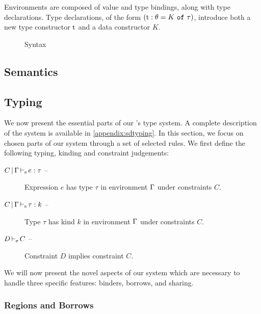 
Environments are composed of value and type bindings, along with type
declarations. Type declarations, of the form
$(\mathrm{t} : \theta = K\ \mathtt{of}\ \tau)$, introduce both a new type constructor $\mathrm{t}$ and
a data constructor $K$.

\begin{figure*}[t]
  \centering
  
  \caption{Syntax}
  \label{grammar}
\end{figure*}


\clearpage
\subsection{Semantics}
\label{sem}




\clearpage
\subsection{Typing}
\label{sdtyping}

We now present the essential parts of our \lang's type system. A complete
description of the system is available in \cref{appendix:sdtyping}.
In this section, we focus on chosen parts of our system
through a set of selected rules.
%
We first define the following typing, kinding and constraint judgements:
\begin{description}
\item[$C \operatorname{|} \Gamma \operatorname{\vdash_s} e : \tau$ --]
  Expression $e$ has type $\tau$ in environment $\Gamma$ under constraints $C$.
\item[$C \operatorname{|} \Gamma \operatorname{\vdash_s} \tau : k$ --]
  Type $\tau$ has kind $k$ in environment $\Gamma$ under constraints $C$.
\item[$D \operatorname{\vdash_e} C$ --] Constraint $D$ implies constraint $C$.
\end{description}

We will now present the novel aspects of our system which are necessary to handle
three specific features: binders, borrows, and sharing.

\subsubsection{Regions and Borrows}


